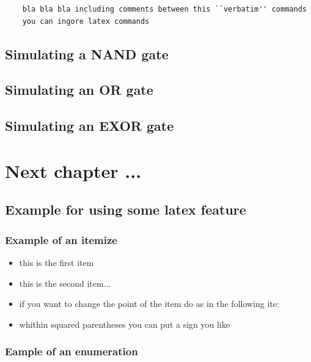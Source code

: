	\begin{verbatim}
	bla bla bla including comments between this ``verbatim'' commands
	you can ingore latex commands  	
	\end{verbatim}



\section{Simulating a NAND gate}

\section{Simulating an OR gate}


\section{Simulating an EXOR gate}



\chapter{Next chapter ...}



\section{Example for using some latex feature}

\subsection{Example of an itemize}

\begin{itemize}
\item this is the first item
\item this is the second item...
\item if you want to change the point of the item do as in the following ite:
\item[-] whithin squared parentheses you can put a sign you like
\end{itemize} 


\subsection{Eample of an enumeration}

